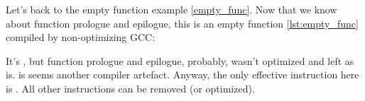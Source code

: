 
Let's back to the empty function example \ref{empty_func}.
Now that we know about function prologue and epilogue,
this is an empty function \ref{lst:empty_func} compiled by non-optimizing GCC:



It's , but function prologue and epilogue, probably, wasn't optimized and left as is.
 is seems another compiler artefact.
Anyway, the only effective instruction here is .
All other instructions can be removed (or optimized).


